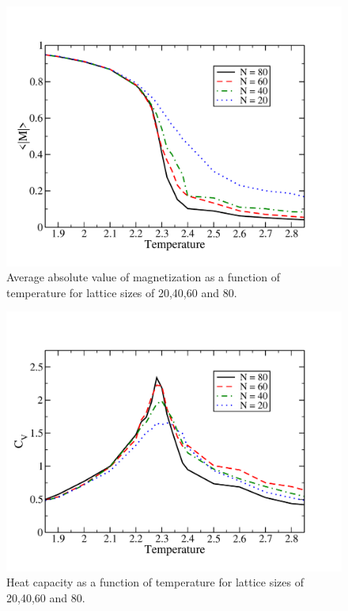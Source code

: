\documentclass[prc,amsmath,twocolumn,superscriptaddress]{revtex4}
\begin{document}
\begin{figure}[b]
\includegraphics[scale=0.33]{avg_mag.pdf}
\caption{Average absolute value of magnetization as a function of temperature for lattice sizes of 20,40,60 and 80.}
\label{avg_m}
\end{figure}

\begin{figure}[t]
\includegraphics[scale=0.33]{var_energy.pdf}
\caption{Heat capacity as a function of temperature for lattice sizes of 20,40,60 and 80.}
\label{var_e}
\end{figure}
\end{document}
